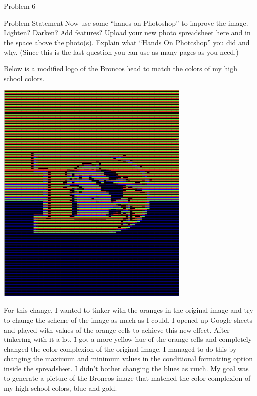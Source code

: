 \begin{problem}{Problem 6}
    \begin{statement}{Problem Statement}
        Now use some “hands on Photoshop” to improve the image. Lighten? Darken? Add features? Upload your new photo spreadsheet here and in the space above the photo(s). Explain what “Hands On Photoshop” 
        you did and why. (Since this is the last question you can use as many pages as you need.)
    \end{statement}

    \begin{highlight}[Solution]
        Below is a modified logo of the Broncos head to match the colors of my high school colors.
        \begin{center}
            \includegraphics[width=0.7\textwidth]{Images/Broncos Recolored.png}
        \end{center}
        For this change, I wanted to tinker with the oranges in the original image and try to change the scheme of the image as much as I could. I opened up Google sheets and played with values of the 
        orange cells to achieve this new effect. After tinkering with it a lot, I got a more yellow hue of the orange cells and completely changed the color complexion of the original image. I managed to 
        do this by changing the maximum and minimum values in the conditional formatting option inside the spreadsheet. I didn't bother changing the blues as much. My goal was to generate a picture of the
        Broncos image that matched the color complexion of my high school colors, blue and gold.
    \end{highlight}
\end{problem}